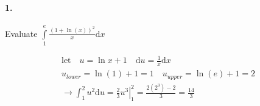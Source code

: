 


\renewcommand\assignment{Homework Set III, Due Friday, January 27th, 2023}


    \iffalse
    \begin{equation*}
        \begin{gathered}
            Equations go here.
        \end{gathered}
    \end{equation*}

    \resizebox{\hsize}{!}{$Long equation goes here$}

    \begin{multicol*}{# of columns}
    \end{multicol*}

    \horizontal

    \fi


    \paragraph*{1.}
    Evaluate $\int\limits_{1}^{e}\frac{(1+\ln(x))^2}{x}\mathrm{d}x$

    \begin{mdframed}
        \begin{equation*}
            \begin{gathered}
                \text{let} \quad u = \ln x + 1 \quad \mathrm{d}u = \frac{1}{x}\mathrm{d}x    \\
                u_{lower} = \ln(1) + 1 = 1 \quad u_{upper} = \ln(e) + 1 = 2 \\
                \rightarrow \int_{1}^{2}u^2\mathrm{d}u = \left.\frac{2}{3}u^3\right|_{1}^{2} = \frac{2(2^3) - 2}{3} = \boxed{\frac{14}{3}}
            \end{gathered}
        \end{equation*}
    \end{mdframed}


